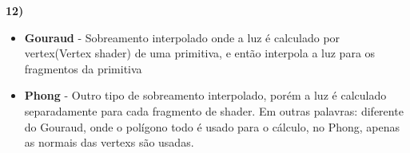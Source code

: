 \textbf{12)} 

\begin{itemize}
	\item \textbf{Gouraud} - Sobreamento interpolado onde a luz é calculado 
	por vertex(Vertex shader) de uma primitiva, e então interpola a luz para 
	os fragmentos da primitiva 
	\item \textbf{Phong} - Outro tipo de sobreamento interpolado, porém a luz 
	é calculado separadamente para cada fragmento de shader. Em outras palavras:
	diferente do Gouraud, onde o polígono todo é usado para o cálculo, no Phong, 
	apenas as normais das vertexs são usadas.
	
\end{itemize}